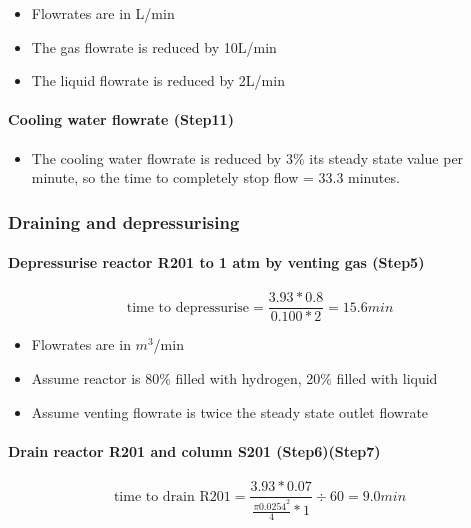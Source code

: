     \begin{itemize}
        \item Flowrates are in L/min
        \item The gas flowrate is reduced by 10L/min
        \item The liquid flowrate is reduced by 2L/min
    \end{itemize}
    
\paragraph{Cooling water flowrate (Step11)}
    \begin{itemize}
        \item The cooling water flowrate is reduced by 3\% its steady state value per minute, so the time to completely stop flow = 33.3 minutes.
    \end{itemize}
    
\subsubsection{Draining and depressurising}   
\paragraph{Depressurise reactor R201 to 1 atm by venting gas (Step5)}
    \begin{equation}
        \text{time to depressurise} = \frac{3.93 * 0.8}{0.100 * 2}=15.6 min
    \end{equation}
    
    \begin{itemize}
        \item Flowrates are in $m^3$/min
        \item Assume reactor is 80\% filled with hydrogen, 20\% filled with liquid
        \item Assume venting flowrate is twice the steady state outlet flowrate
    \end{itemize}
    
\paragraph{Drain reactor R201 and column S201 (Step6)(Step7)}   

    \begin{equation}
        \text{time to drain R201} = \frac{3.93 * 0.07}{\frac{\pi 0.0254^2}{4} * 1} \div 60 =9.0 min
    \end{equation}
    
